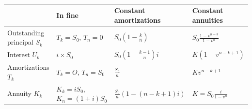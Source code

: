 \begin{f} 
\ \newline

	\footnotesize
\renewcommand{\arraystretch}{2}
\begin{tabular}{|m{10ex}|m{19ex}|m{19ex}|m{17ex}|}
\rowcolor{BleuProfondIRA!40}   	\hline &\textbf{In fine}			&   	\textbf{Constant amortizations} &  		\textbf{Constant annuities} \\
	\hline Outstan\-ding principal \(S_k\) & \(T_k=S_0\), \(T_n=0\)& \(S_{0}\left(1-\frac{k}{n}\right)\) & \(S_{0} \frac{1-v^{n-k}}{1-v^{n}}\)\\
	\hline Interest \(U_k\) 		& \(i\times S_0\) & \(S_{0}\left(1-\frac{k-1}{n}\right) i\) & \(K\left(1-v^{n-k+1}\right)\) \\
	\hline Amortiz\-ations \(T_k\) &	\(T_k=O\), \(T_n=S_0\) & \(\frac{S_{0}}{n}\) & \(K v^{n-k+1}\) \\
	\hline Annuity \(K_k\) & 	\(K_k=i S_0\), \(K_n=(1+i)S_0\) 	 & \(\frac{S_{0}}{n}(1-(n-k+1) i) \) & \(K=S_{0} \frac{i}{1-v^{n}} \) \\
	\hline
\end{tabular}

\end{f}
